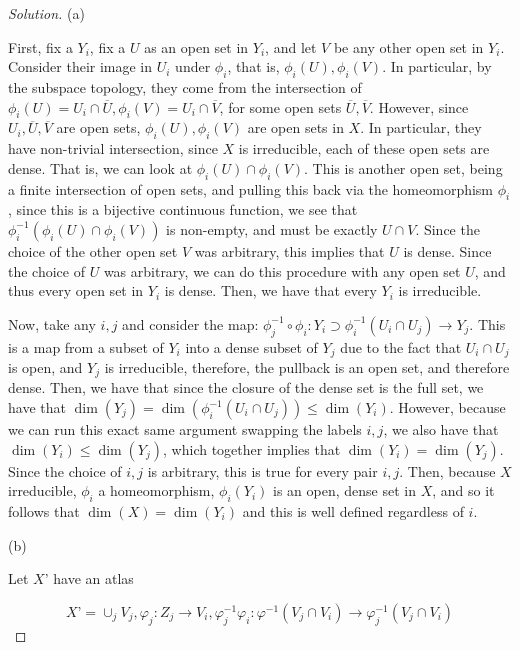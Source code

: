 \documentclass[10pt]{article}
\begin{document}
\begin{proof}[Solution]

(a)

First, fix a $Y_i$, fix a $U$ as an open set in $Y_i$, and let $V$ be any other open set in $Y_i$. Consider their image in $U_i$ under $\phi_i$, that is, $\phi_i(U), \phi_i(V)$. In particular, by the subspace topology, they come from the intersection of $\phi_i(U)  = U_i \cap \overline{U}, \phi_i(V)  = U_i \cap \overline{V}$, for some open sets $\overline{U}, \overline{V}$. However, since $U_i, \overline{U}, \overline{V}$ are open sets, $\phi_i(U), \phi_i(V)$ are open sets in $X$. In particular, they have non-trivial intersection, since $X$ is irreducible, each of these open sets are dense. That is, we can look at $\phi_i(U) \cap \phi_i(V)$. This is another open set, being a finite intersection of open sets, and pulling this back via the homeomorphism $\phi_i$, since this is a bijective continuous function, we see that $\phi_i^{-1}(\phi_i(U) \cap \phi_i(V))$ is non-empty, and must be exactly $U \cap V$. Since the choice of the other open set $V$ was arbitrary, this implies that $U$ is dense. Since the choice of $U$ was arbitrary, we can do this procedure with any open set $U$, and thus every open set in $Y_i$ is dense. Then, we have that every $Y_i$ is irreducible.

Now, take any $i,j$ and consider the map: $\phi_j^{-1} \circ \phi_i: Y_i \supset \phi_i^{-1}(U_i \cap U_j) \to Y_j$. This is a map from a subset of $Y_i$ into a dense subset of $Y_j$ due to the fact that $U_i \cap U_j$ is open, and $Y_j$ is irreducible, therefore, the pullback is an open set, and therefore dense. Then, we have that since the closure of the dense set is the full set, we have that $\dim(Y_j) =  \dim(\phi_i^{-1}(U_i \cap U_j)) \leq \dim(Y_i)$. However, because we can run this exact same argument swapping the labels $i,j$, we also have that $\dim(Y_i) \leq \dim(Y_j)$, which together implies that $\dim(Y_i) = \dim(Y_j)$. Since the choice of $i,j$ is arbitrary, this is true for every pair $i,j$. Then, because $X$ irreducible, $\phi_i$ a homeomorphism, $\phi_i(Y_i)$ is an open, dense set in $X$, and so it follows that $\dim(X) = \dim(Y_i)$ and this is well defined regardless of $i$.

(b)

Let $X’$ have an atlas

$$X’ = \cup_j V_j, \varphi_j: Z_j \to V_i, \varphi_j^{-1}\varphi_i: \varphi^{-1}(V_j \cap V_i) \to \varphi^{-1}_j(V_j \cap V_i)$$


\end{proof}
\end{document}

